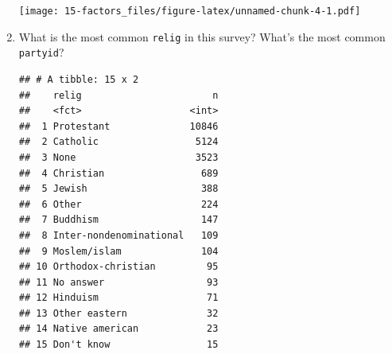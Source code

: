 \documentclass[]{book}
\newenvironment{Shaded}{\begin{snugshade}}{\end{snugshade}}
\newcommand{\DataTypeTok}[1]{\textcolor[rgb]{0.13,0.29,0.53}{#1}}
\newcommand{\DecValTok}[1]{\textcolor[rgb]{0.00,0.00,0.81}{#1}}
\newcommand{\KeywordTok}[1]{\textcolor[rgb]{0.13,0.29,0.53}{\textbf{#1}}}
\newcommand{\NormalTok}[1]{#1}
\newcommand{\OperatorTok}[1]{\textcolor[rgb]{0.81,0.36,0.00}{\textbf{#1}}}
\newcommand{\OtherTok}[1]{\textcolor[rgb]{0.56,0.35,0.01}{#1}}
\newcommand{\StringTok}[1]{\textcolor[rgb]{0.31,0.60,0.02}{#1}}
\theoremstyle{definition}
\theoremstyle{definition}
\theoremstyle{definition}
\theoremstyle{remark}
\begin{document}
\begin{enumerate}
\begin{Shaded}
\end{Shaded}

  \texttt{[image: 15-factors\_files/figure-latex/unnamed-chunk-4-1.pdf]}
\item
  What is the most common \texttt{relig} in this survey? What's the most
  common \texttt{partyid}?

\begin{Shaded}
\end{Shaded}

\begin{verbatim}
## # A tibble: 15 x 2
##    relig                       n
##    <fct>                   <int>
##  1 Protestant              10846
##  2 Catholic                 5124
##  3 None                     3523
##  4 Christian                 689
##  5 Jewish                    388
##  6 Other                     224
##  7 Buddhism                  147
##  8 Inter-nondenominational   109
##  9 Moslem/islam              104
## 10 Orthodox-christian         95
## 11 No answer                  93
## 12 Hinduism                   71
## 13 Other eastern              32
## 14 Native american            23
## 15 Don't know                 15
\end{verbatim}


\end{enumerate}
\end{document}
